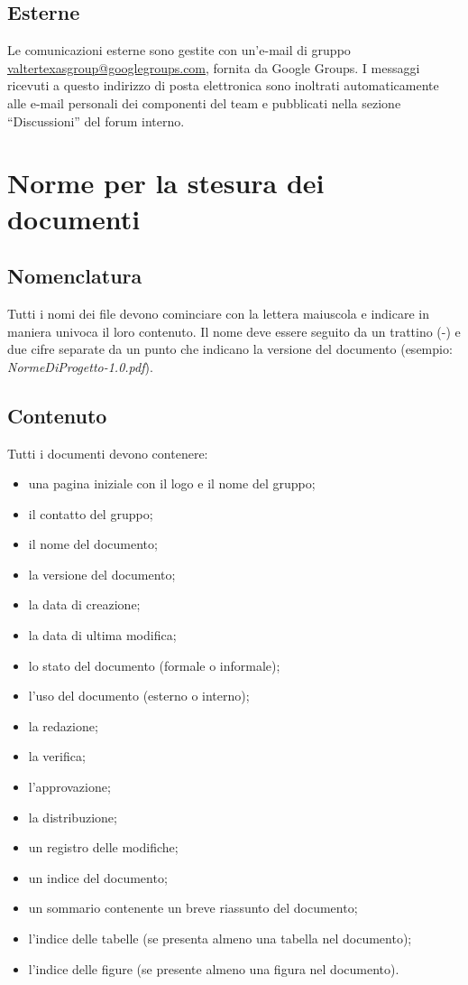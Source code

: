 \section{Esterne}
Le comunicazioni esterne sono gestite con un'e-mail di gruppo
\url{valtertexasgroup@googlegroups.com}, fornita da Google Groups. I messaggi
ricevuti a questo indirizzo di posta elettronica sono inoltrati automaticamente alle e-mail personali dei componenti del team e pubblicati nella
sezione ``Discussioni'' del forum interno.


\chapter{Norme per la stesura dei documenti}
\thispagestyle{fancy}

\section{Nomenclatura}
Tutti i nomi dei file devono cominciare con la lettera maiuscola e
indicare in maniera univoca il loro contenuto. Il nome deve essere seguito da un
trattino (-) e due cifre separate da un punto che indicano la versione del
documento (esempio: \emph{NormeDiProgetto-1.0.pdf}).

\section{Contenuto}
Tutti i documenti devono contenere: 
\begin{itemize}
\item {una pagina iniziale con il logo e il nome del gruppo;}
\item {il contatto del gruppo;}
\item {il nome del documento;}
\item {la versione del documento;}
\item {la data di creazione;}
\item {la data di ultima modifica;}
\item {lo stato del documento (formale o informale);}
\item {l'uso del documento (esterno o interno);}
\item {la redazione;}
\item {la verifica;}
\item {l'approvazione;}
\item {la distribuzione;}
\item {un registro delle modifiche;}
\item {un indice del documento;}
\item {un sommario contenente un breve riassunto del documento;}
\item {l'indice delle tabelle (se presenta almeno una tabella nel documento);}
\item {l'indice delle figure (se presente almeno una figura nel documento).}
\end{itemize} 

